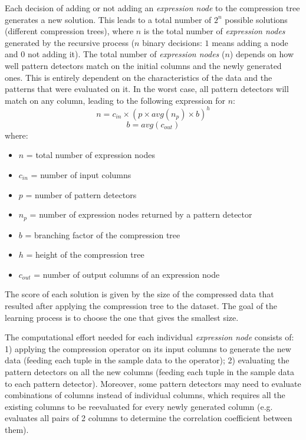 Each decision of adding or not adding an \textit{expression node} to the compression tree generates a new solution. This leads to a total number of \(2^n\) possible solutions (different compression trees), where \(n\) is the total number of \textit{expression nodes} generated by the recursive process (\(n\) binary decisions: \(1\) means adding a node and \(0\) not adding it). The total number of \textit{expression nodes} (\(n\)) depends on how well pattern detectors match on the initial columns and the newly generated ones. This is entirely dependent on the characteristics of the data and the patterns that were evaluated on it. In the worst case, all pattern detectors will match on any column, leading to the following expression for \(n\):
\begin{equation}
\label{eq:optimizationproblem:n}
    n = c_{in} \times (p \times \mathit{avg}(n_{p}) \times b) ^ h
\end{equation}
\begin{equation}
\label{eq:optimizationproblem:b}
    b = \mathit{avg}(c_{out})
\end{equation}
where:
\begin{itemize}
    \item[] \(n\) = total number of expression nodes
    \item[] \(c_{in}\) = number of input columns
    \item[] \(p\) = number of pattern detectors
    \item[] \(n_{p}\) = number of expression nodes returned by a pattern detector
    \item[] \(b\) = branching factor of the compression tree
    \item[] \(h\) = height of the compression tree
    \item[] \(c_{out}\) = number of output columns of an expression node
\end{itemize}

The score of each solution is given by the size of the compressed data that resulted after applying the compression tree to the dataset. The goal of the learning process is to choose the one that gives the smallest size.

The computational effort needed for each individual \textit{expression node} consists of: 1) applying the compression operator on its input columns to generate the new data (feeding each tuple in the sample data to the operator); 2) evaluating the pattern detectors on all the new columns (feeding each tuple in the sample data to each pattern detector). Moreover, some pattern detectors may need to evaluate combinations of columns instead of individual columns, which requires all the existing columns to be reevaluated for every newly generated column (e.g.  evaluates all pairs of 2 columns to determine the correlation coefficient between them).

\iffalse
TODO:
better formalize problem
https://en.wikipedia.org/wiki/Optimization\_problem
\fi

